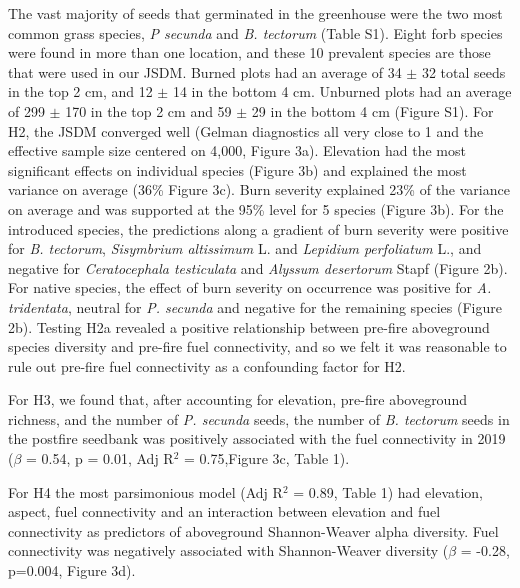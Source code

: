 \documentclass[
  12pt,
]{article}
\begin{document}
The vast majority of seeds that germinated in the greenhouse were the
two most common grass species, \emph{P secunda} and \emph{B. tectorum}
(Table S1). Eight forb species were found in more than one location, and
these 10 prevalent species are those that were used in our JSDM. Burned
plots had an average of 34 \(\pm\) 32 total seeds in the top 2 cm, and
12 \(\pm\) 14 in the bottom 4 cm. Unburned plots had an average of 299
\(\pm\) 170 in the top 2 cm and 59 \(\pm\) 29 in the bottom 4 cm (Figure
S1). For H2, the JSDM converged well (Gelman diagnostics all very close
to 1 and the effective sample size centered on 4,000, Figure 3a).
Elevation had the most significant effects on individual species (Figure
3b) and explained the most variance on average (36\% Figure 3c). Burn
severity explained 23\% of the variance on average and was supported at
the 95\% level for 5 species (Figure 3b). For the introduced species,
the predictions along a gradient of burn severity were positive for
\emph{B. tectorum}, \emph{Sisymbrium altissimum} L. and \emph{Lepidium
perfoliatum} L., and negative for \emph{Ceratocephala testiculata} and
\emph{Alyssum desertorum} Stapf (Figure 2b). For native species, the
effect of burn severity on occurrence was positive for \emph{A.
tridentata}, neutral for \emph{P. secunda} and negative for the
remaining species (Figure 2b). Testing H2a revealed a positive
relationship between pre-fire aboveground species diversity and pre-fire
fuel connectivity, and so we felt it was reasonable to rule out pre-fire
fuel connectivity as a confounding factor for H2.

For H3, we found that, after accounting for elevation, pre-fire
aboveground richness, and the number of \emph{P. secunda} seeds, the
number of \emph{B. tectorum} seeds in the postfire seedbank was
positively associated with the fuel connectivity in 2019 (\(\beta\) =
0.54, p = 0.01, Adj R\(^2\) = 0.75,Figure 3c, Table 1).

For H4 the most parsimonious model (Adj R\(^2\) = 0.89, Table 1) had
elevation, aspect, fuel connectivity and an interaction between
elevation and fuel connectivity as predictors of aboveground
Shannon-Weaver alpha diversity. Fuel connectivity was negatively
associated with Shannon-Weaver diversity (\(\beta\) = -0.28, p=0.004,
Figure 3d).
\end{document}
